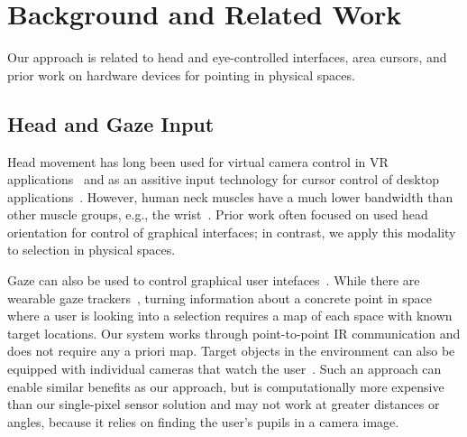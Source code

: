 \section{Background and Related Work}
Our approach is related to head and eye-controlled interfaces, area cursors, and prior work on hardware devices for pointing in physical spaces.
\subsection{Head and Gaze Input}
Head movement has long been used for virtual camera control in VR applications~\cite{pausch_user_1993} and as an assitive input technology for cursor control of desktop applications~\cite{radwin1990method}. However, human neck muscles have a much lower bandwidth than other muscle groups, e.g., the wrist~\cite{card_morphological_1991}.
Prior work often focused on used head orientation for control of graphical interfaces; in contrast, we apply this modality to selection in physical spaces.

Gaze can also be used to control graphical user intefaces~\cite{kumar2007eyepoint}. While there are wearable gaze trackers~\cite{bulling2009wearable}, turning information about a concrete point in space where a user is looking into a selection requires a map of each space with known target locations. Our system works through point-to-point IR communication and does not require any a priori map. Target objects in the environment can also be equipped with individual cameras that watch the user~\cite{smith2013gaze,vertegaal2005media}. Such an approach can enable similar benefits as our approach, but is computationally more expensive than our single-pixel sensor solution and may not work at greater distances or angles, because it relies on finding the user's pupils in a camera image.

